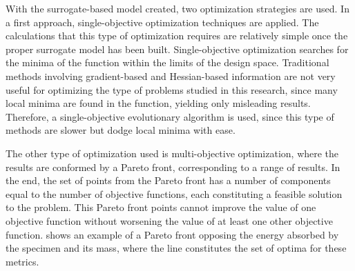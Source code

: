\documentclass[cmfonts]{witpress}
\begin{document}


With the surrogate-based model created, two optimization strategies are used. In a first approach, single-objective optimization techniques are applied. The calculations that this type of optimization requires are relatively simple once the proper surrogate model has been built. Single-objective optimization searches for the minima of the function within the limits of the design space. Traditional methods involving gradient-based and Hessian-based information are not very useful for optimizing the type of problems studied in this research, since many local minima are found in the function, yielding only misleading results. Therefore, a single-objective evolutionary algorithm is used, since this type of methods are slower but dodge local minima with ease.






The other type of optimization used is multi-objective optimization, where the results are conformed by a Pareto front, corresponding to a range of results. In the end, the set of points from the Pareto front has a number of components equal to the number of objective functions, each constituting a feasible solution to the problem. This Pareto front points cannot improve the value of one objective function without worsening the value of at least one other objective function.  shows an example of a Pareto front opposing the energy absorbed by the specimen and its mass, where the line constitutes the set of optima for these metrics.
\end{document}
